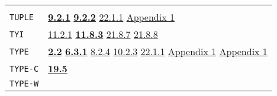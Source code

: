 \documentclass[a4paper]{scrbook}
\begin{document}
\begin{longtable}[]{@{}ll@{}}
\begin{minipage}[t]{0.70\columnwidth}
\end{minipage}\tabularnewline
\begin{minipage}[t]{0.24\columnwidth}\raggedright\strut
\texttt{TUPLE}\strut
\end{minipage} & \begin{minipage}[t]{0.70\columnwidth}\raggedright\strut
\textbf{\href{09-functions.md\#921-tuple-and-tuple-the-type-1}{9.2.1}}
\textbf{\href{09-functions.md\#922-tuple-the-subr-and-ituple}{9.2.2}}
\href{22-storage-management.md\#2211-stacks-and-other-internal-vectors}{22.1.1}
\href{appendix-1-a-look-inside.md\#appendix-1-a-look-inside}{Appendix 1}\strut
\end{minipage}\tabularnewline
\begin{minipage}[t]{0.24\columnwidth}\raggedright\strut
\texttt{TYI}\strut
\end{minipage} & \begin{minipage}[t]{0.70\columnwidth}\raggedright\strut
\href{11-input-output.md\#1121-open}{11.2.1} \textbf{\href{11-input-output.md\#1183-tyi}{11.8.3}}
\href{21-interrupts.md\#2187-blocked}{21.8.7} \href{21-interrupts.md\#2188-unblocked}{21.8.8}\strut
\end{minipage}\tabularnewline
\begin{minipage}[t]{0.24\columnwidth}\raggedright\strut
\texttt{TYPE}\strut
\end{minipage} & \begin{minipage}[t]{0.70\columnwidth}\raggedright\strut
\textbf{\href{02-read-evaluate-print.md\#22-philosophy-types-1}{2.2}} \textbf{\href{06-data-types.md\#631-type-1}{6.3.1}}
\href{08-truth.md\#824-object-properties-1}{8.2.4} \href{10-looping.md\#1023-examples-1}{10.2.3}
\href{22-storage-management.md\#2211-stacks-and-other-internal-vectors}{22.1.1}
\href{appendix-1-a-look-inside.md\#appendix-1-a-look-inside}{Appendix 1}
\href{appendix-1-a-look-inside.md\#basic-data-structures}{Appendix 1}\strut
\end{minipage}\tabularnewline
\begin{minipage}[t]{0.24\columnwidth}\raggedright\strut
\texttt{TYPE-C}\strut
\end{minipage} & \begin{minipage}[t]{0.70\columnwidth}\raggedright\strut
\textbf{\href{19-compiled-programs.md\#195-type-c-and-type-w}{19.5}}\strut
\end{minipage}\tabularnewline
\begin{minipage}[t]{0.24\columnwidth}\raggedright\strut
\texttt{TYPE-W}\strut
\end{minipage} & \begin{minipage}[t]{0.70\columnwidth}\raggedright\strut

\end{minipage}
\end{longtable}
\end{document}

